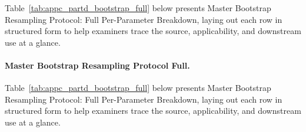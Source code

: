 \clearpage
{\tablestripes\tablefontsize

\noindent Table~\ref{tab:appc_partd_bootstrap_full} below presents Master Bootstrap Resampling Protocol: Full Per-Parameter Breakdown, laying out each row in structured form to help examiners trace the source, applicability, and downstream use at a glance. %
\paragraph{Master Bootstrap Resampling Protocol Full.} %
\noindent Table~\ref{tab:appc_partd_bootstrap_full} below presents Master Bootstrap Resampling Protocol: Full Per-Parameter Breakdown, laying out each row in structured form to help examiners trace the source, applicability, and downstream use at a glance. %



}
